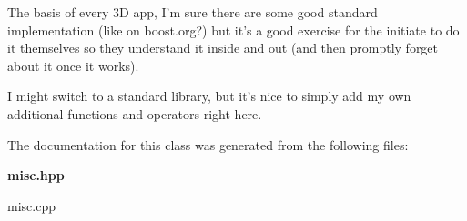 The basis of every 3D app, I'm sure there are some good standard implementation (like on boost.org?) but it's a good exercise for  the initiate to do it themselves so they understand it inside and out (and then promptly forget about it once it works).

I might switch to a standard library, but it's nice to simply add my own additional functions and operators right here. 



The documentation for this class was generated from the following files:\begin{CompactItemize}
\item 
{\bf misc.hpp}\item 
misc.cpp\end{CompactItemize}
